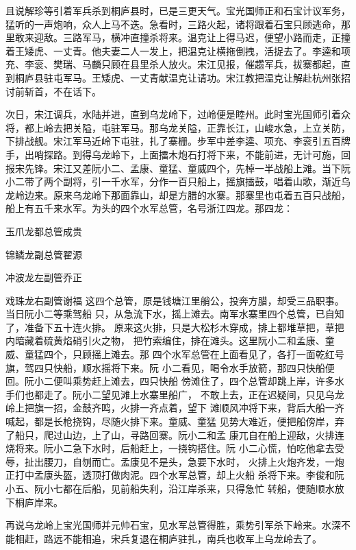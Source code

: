 且说解珍等引着军兵杀到桐庐县时，已是三更天气。宝光国师正和石宝计议军务，
猛听的一声炮响，众人上马不迭。急看时，三路火起，诸将跟着石宝只顾逃命，那
里敢来迎敌。三路军马，横冲直撞杀将来。温克让上得马迟，便望小路而走，正撞
着王矮虎、一丈青。他夫妻二人一发上，把温克让横拖倒拽，活捉去了。李逵和项
充、李衮、樊瑞、马麟只顾在县里杀人放火。宋江见报，催趱军兵，拔寨都起，直
到桐庐县驻屯军马。王矮虎、一丈青献温克让请功。宋江教把温克让解赴杭州张招
讨前斩首，不在话下。

次日，宋江调兵，水陆并进，直到乌龙岭下，过岭便是睦州。此时宝光国师引着众
将，都上岭去把关隘，屯驻军马。那乌龙关隘，正靠长江，山峻水急，上立关防，
下排战舰。宋江军马近岭下屯驻，扎了寨栅。步军中差李逵、项充、李衮引五百牌
手，出哨探路。到得乌龙岭下，上面擂木炮石打将下来，不能前进，无计可施，回
报宋先锋。宋江又差阮小二、孟康、童猛、童威四个，先棹一半战船上滩。当下阮
小二带了两个副将，引一千水军，分作一百只船上，摇旗擂鼓，唱着山歌，渐近乌
龙岭边来。原来乌龙岭下那面靠山，却是方腊的水寨。那寨里也屯着五百只战船，
船上有五千来水军。为头的四个水军总管，名号浙江四龙。那四龙：

玉爪龙都总管成贵

锦鳞龙副总管翟源

冲波龙左副管乔正

戏珠龙右副管谢福
这四个总管，原是钱塘江里艄公，投奔方腊，却受三品职事。当日阮小二等乘驾船
只，从急流下水，摇上滩去。南军水寨里四个总管，已自知了，准备下五十连火排。
原来这火排，只是大松杉木穿成，排上都堆草把，草把内暗藏着硫黄焰硝引火之物，
把竹索编住，排在滩头。这里阮小二和孟康、童威、童猛四个，只顾摇上滩去。那
四个水军总管在上面看见了，各打一面乾红号旗，驾四只快船，顺水摇将下来。阮
小二看见，喝令水手放箭，那四只快船便回。阮小二便叫乘势赶上滩去，四只快船
傍滩住了，四个总管却跳上岸，许多水手们也都走了。阮小二望见滩上水寨里船广，
不敢上去，正在迟疑间，只见乌龙岭上把旗一招，金鼓齐鸣，火排一齐点着，望下
滩顺风冲将下来，背后大船一齐喊起，都是长枪挠钩，尽随火排下来。童威、童猛
见势大难近，便把船傍岸，弃了船只，爬过山边，上了山，寻路回寨。阮小二和孟
康兀自在船上迎敌，火排连烧将来。阮小二急下水时，后船赶上，一挠钩搭住。阮
小二心慌，怕吃他拿去受辱，扯出腰刀，自刎而亡。孟康见不是头，急要下水时，
火排上火炮齐发，一炮正打中孟康头盔，透顶打做肉泥。四个水军总管，却上火船
杀将下来。李俊和阮小五、阮小七都在后船，见前船失利，沿江岸杀来，只得急忙
转船，便随顺水放下桐庐岸来。

再说乌龙岭上宝光国师并元帅石宝，见水军总管得胜，乘势引军杀下岭来。水深不
能相赶，路远不能相追，宋兵复退在桐庐驻扎，南兵也收军上乌龙岭去了。

